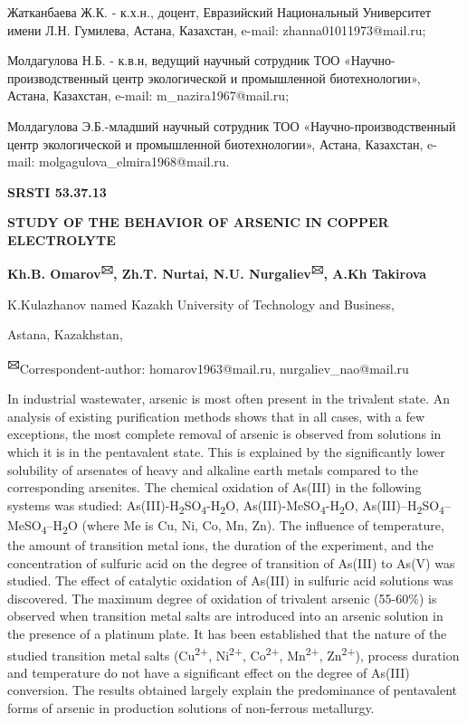 Жатканбаева Ж.К. - к.х.н., доцент, Евразийский Национальный Университет
имени Л.Н. Гумилева, Астана, Казахстан, e-mail: zhanna01011973@mail.ru;

Молдагулова Н.Б. - к.в.н, ведущий научный сотрудник ТОО
«Научно-производственный центр экологической и промышленной
биотехнологии», Астана, Казахстан, e-mail: m\_nazira1967@mail.ru;

Молдагулова Э.Б.-младший научный сотрудник ТОО «Научно-производственный
центр экологической и промышленной биотехнологии», Астана, Казахстан,
e-mail: molgagulova\_elmira1968@mail.ru.

{\bfseries SRSTI 53.37.13}

{\bfseries STUDY OF THE BEHAVIOR OF ARSENIC IN COPPER ELECTROLYTE}

{\bfseries Kh.B. Omarov\textsuperscript{🖂}, Zh.T. Nurtai, N.U.
Nurgaliev\textsuperscript{🖂}, A.Kh Takirova}

K.Kulazhanov named Kazakh University of Technology and Business,

Astana, Kazakhstan,

{\bfseries \textsuperscript{🖂}}Correspondent-author: homarov1963@mail.ru,
nurgaliev\_nao@mail.ru

In industrial wastewater, arsenic is most often present in the trivalent
state. An analysis of existing purification methods shows that in all
cases, with a few exceptions, the most complete removal of arsenic is
observed from solutions in which it is in the pentavalent state. This is
explained by the significantly lower solubility of arsenates of heavy
and alkaline earth metals compared to the corresponding arsenites. The
chemical oxidation of As(III) in the following systems was studied:
As(III)-H\textsubscript{2}SO\textsubscript{4}-H\textsubscript{2}O,
As(III)-MeSO\textsubscript{4}-H\textsubscript{2}O,
As(III)--H\textsubscript{2}SO\textsubscript{4}--MeSO\textsubscript{4}--H\textsubscript{2}O
(where Me is Cu, Ni, Co, Mn, Zn). The influence of temperature, the
amount of transition metal ions, the duration of the experiment, and the
concentration of sulfuric acid on the degree of transition of As(III) to
As(V) was studied. The effect of catalytic oxidation of As(III) in
sulfuric acid solutions was discovered. The maximum degree of oxidation
of trivalent arsenic (55-60\%) is observed when transition metal salts
are introduced into an arsenic solution in the presence of a platinum
plate. It has been established that the nature of the studied transition
metal salts (Cu\textsuperscript{2+}, Ni\textsuperscript{2+},
Co\textsuperscript{2+}, Mn\textsuperscript{2+}, Zn\textsuperscript{2+}),
process duration and temperature do not have a significant effect on the
degree of As(III) conversion. The results obtained largely explain the
predominance of pentavalent forms of arsenic in production solutions of
non-ferrous metallurgy.

